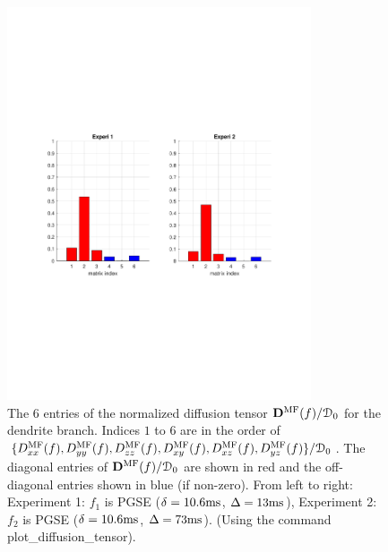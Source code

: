 \documentclass[a4paper]{article}
\begin{document}
\begin{figure}
    \centering
    \includegraphics[width=0.8\textwidth]{paper/matrix_index}
    \caption{The 6 entries of the normalized diffusion tensor $\mathbf{D}^\text{MF}(f)/\mathcal{D}_0$ for the dendrite branch.
    Indices $1$ to $6$ are in the order of $\{D^{\text{MF}}_{xx}(f),D^{\text{MF}}_{yy}(f),D^{\text{MF}}_{zz}(f),D^{\text{MF}}_{xy}(f),D^{\text{MF}}_{xz}(f),D^{\text{MF}}_{yz}(f)\}/\mathcal{D}_0$. The diagonal entries of $\mathbf{D}^\text{MF}(f)/\mathcal{D}_0$ are shown in red and the off-diagonal entries shown in blue (if non-zero). From left to right: Experiment 1: $f_1$ is PGSE ($\delta=10.6\mathrm{ms}$, $\Delta=13\mathrm{ms}$), Experiment 2: $f_2$ is PGSE ($\delta=10.6\mathrm{ms}$, $\Delta=73\mathrm{ms}$). (Using the command plot\_diffusion\_tensor).}
    \label{fig:dtensor}
\end{figure}
\end{document}
